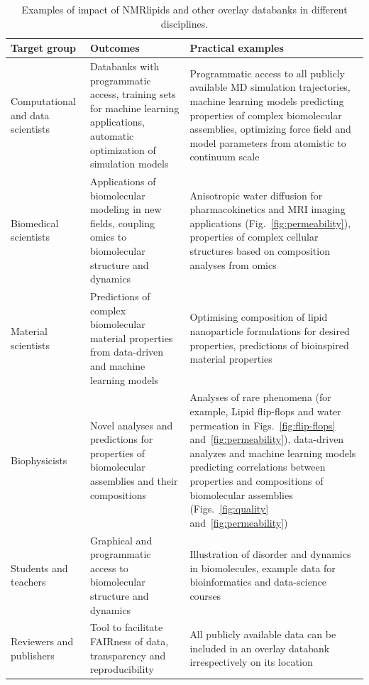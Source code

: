 \documentclass[fleqn,10pt]{wlscirep}
\begin{document}
\begin{table}[t]
    \centering
    \begin{tabular}{p{3.0cm}  p{4.0cm}  p{7.0cm}}
     Target group  &  Outcomes     & Practical examples \\
    \hline
    Computational and data scientists & Databanks with programmatic access, training sets for machine learning applications, automatic optimization of simulation models & Programmatic access to all publicly available MD simulation trajectories, machine learning models predicting properties of complex biomolecular assemblies, optimizing force field and model parameters from atomistic to continuum scale \\

    Biomedical scientists & Applications of biomolecular modeling in new fields, coupling omics to biomolecular structure and dynamics & Anisotropic water diffusion for pharmacokinetics and MRI imaging applications (Fig.~\ref{fig:permeability}), properties of complex cellular structures based on composition analyses from omics \\
    
    Material scientists & Predictions of complex biomolecular material properties from data-driven and machine learning models & Optimising composition of lipid nanoparticle formulations for desired properties, predictions of bioinspired material properties \\
    
    Biophysicists &  Novel analyses and predictions for properties of biomolecular assemblies and their compositions  & Analyses of rare phenomena (for example, Lipid flip-flops and water permeation in Figs.~\ref{fig:flip-flops} and~\ref{fig:permeability}), data-driven analyzes and machine learning models  predicting correlations between properties and compositions of biomolecular assemblies (Figs.~\ref{fig:quality} and~\ref{fig:permeability}) \\

    Students and teachers & Graphical and programmatic access to biomolecular structure and dynamics & Illustration of disorder and dynamics in biomolecules, example data for bioinformatics and data-science courses \\  

    Reviewers and publishers & Tool to facilitate FAIRness of data, transparency and reproducibility & All publicly available data can be included in an overlay databank irrespectively on its location \\ 
    
    \end{tabular}
    \caption{Examples of impact of NMRlipids and other overlay databanks in different disciplines.}
    \label{tab:applications}
\end{table}
\end{document}
